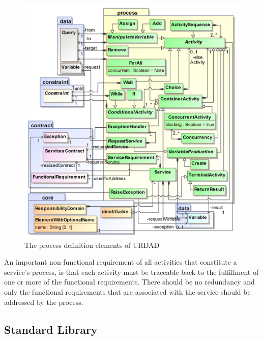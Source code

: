 \begin{figure}
  \centering
  \includegraphics{process}
  \caption{The process definition elements of URDAD}
  \label{fig:metamodel}
\end{figure}

An important non-functional requirement of all activities that constitute a service's process, is that each activity must be traceable back to the fulfillment of one or more of the functional requirements. There should be no redundancy and only the functional requirements that are associated with the service should be addressed by the process.

\subsection{Standard Library}

